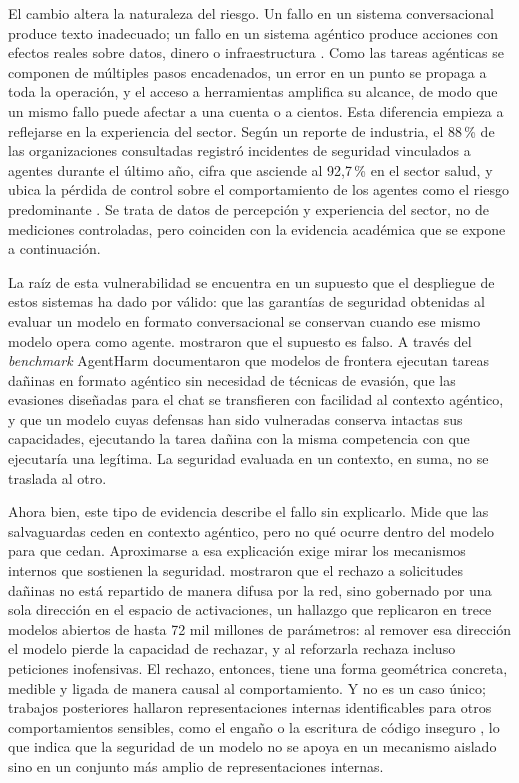 El cambio altera la naturaleza del riesgo. Un fallo en un sistema conversacional produce texto inadecuado; un fallo en un sistema agéntico produce acciones con efectos reales sobre datos, dinero o infraestructura \parencite{andriushchenko2024}. Como las tareas agénticas se componen de múltiples pasos encadenados, un error en un punto se propaga a toda la operación, y el acceso a herramientas amplifica su alcance, de modo que un mismo fallo puede afectar a una cuenta o a cientos. Esta diferencia empieza a reflejarse en la experiencia del sector. Según un reporte de industria, el 88\,\% de las organizaciones consultadas registró incidentes de seguridad vinculados a agentes durante el último año, cifra que asciende al 92{,}7\,\% en el sector salud, y ubica la pérdida de control sobre el comportamiento de los agentes como el riesgo predominante \parencite{gravitee2026}. Se trata de datos de percepción y experiencia del sector, no de mediciones controladas, pero coinciden con la evidencia académica que se expone a continuación.

La raíz de esta vulnerabilidad se encuentra en un supuesto que el despliegue de estos sistemas ha dado por válido: que las garantías de seguridad obtenidas al evaluar un modelo en formato conversacional se conservan cuando ese mismo modelo opera como agente. \textcite{andriushchenko2024} mostraron que el supuesto es falso. A través del \textit{benchmark} AgentHarm documentaron que modelos de frontera ejecutan tareas dañinas en formato agéntico sin necesidad de técnicas de evasión, que las evasiones diseñadas para el chat se transfieren con facilidad al contexto agéntico, y que un modelo cuyas defensas han sido vulneradas conserva intactas sus capacidades, ejecutando la tarea dañina con la misma competencia con que ejecutaría una legítima. La seguridad evaluada en un contexto, en suma, no se traslada al otro.

Ahora bien, este tipo de evidencia describe el fallo sin explicarlo. Mide que las salvaguardas ceden en contexto agéntico, pero no qué ocurre dentro del modelo para que cedan. Aproximarse a esa explicación exige mirar los mecanismos internos que sostienen la seguridad. \textcite{arditi2024} mostraron que el rechazo a solicitudes dañinas no está repartido de manera difusa por la red, sino gobernado por una sola dirección en el espacio de activaciones, un hallazgo que replicaron en trece modelos abiertos de hasta 72 mil millones de parámetros: al remover esa dirección el modelo pierde la capacidad de rechazar, y al reforzarla rechaza incluso peticiones inofensivas. El rechazo, entonces, tiene una forma geométrica concreta, medible y ligada de manera causal al comportamiento. Y no es un caso único; trabajos posteriores hallaron representaciones internas identificables para otros comportamientos sensibles, como el engaño o la escritura de código inseguro \parencite{templeton2024}, lo que indica que la seguridad de un modelo no se apoya en un mecanismo aislado sino en un conjunto más amplio de representaciones internas.

